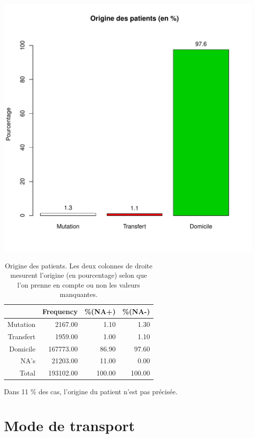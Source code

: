 \documentclass[12pt,english,french,twoside]{report}\usepackage[]{graphicx}\usepackage[]{color}
\makeatletter
\def\maxwidth{ %
  \ifdim\Gin@nat@width>\linewidth
    \linewidth
  \else
    \Gin@nat@width
  \fi
}
\makeatother
\begin{document}
\includegraphics[width=\maxwidth]{figure/mode_entree} 
\begin{table}[ht]
\centering
\begin{tabular}{rrrr}
  \hline
 & Frequency &   \%(NA+) &   \%(NA-) \\ 
  \hline
Mutation & 2167.00 & 1.10 & 1.30 \\ 
  Transfert & 1959.00 & 1.00 & 1.10 \\ 
  Domicile & 167773.00 & 86.90 & 97.60 \\ 
  NA's & 21203.00 & 11.00 & 0.00 \\ 
    Total & 193102.00 & 100.00 & 100.00 \\ 
   \hline
\end{tabular}
\caption[Origine des patients]{Origine des patients. Les deux colonnes de droite mesurent l'origine (en pourcentage) selon que l'on prenne en compte ou non les valeurs manquantes. } 
\label{origine}
\end{table}



Dans 11 \% des cas, l'origine du patient n'est pas précisée.

\section*{Mode de transport}
\end{document}
